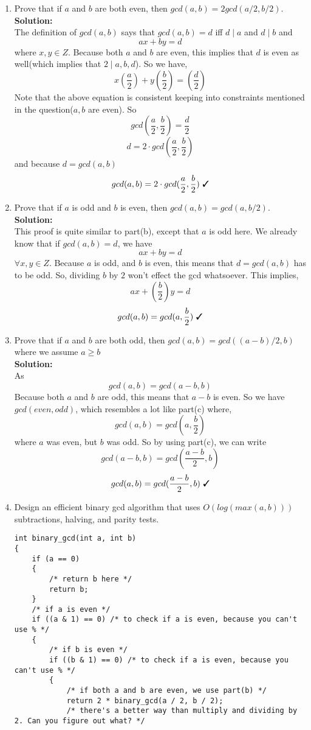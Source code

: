 \documentclass[11pt]{article}
\newcommand{\cmark}{\ding{51}}%
\begin{document}
\begin{enumerate}
\begin{enumerate}
				
				\item Prove that if $a$ and $b$ are both even, then $gcd(a,b) = 2gcd(a/2,b/2)$. \\
				\textbf{Solution: } \\
				The definition of $gcd(a, b)$ says that $gcd(a, b) = d$ iff $d \mid a$ and $d \mid b$ and $$ax + by = d$$ where $x, y \in Z$. Because both $a$ and $b$ are even, this implies that $d$ is even as well(which implies that $2 \mid a, b, d$). So we have, 
				$$x (\frac{a}{2}) + y (\frac{b}{2}) = (\frac{d}{2})$$
				Note that the above equation is consistent keeping into constraints mentioned in the question($a, b$ are even). So 
					$$gcd(\frac{a}{2}, \frac{b}{2}) = \frac{d}{2}$$
					$$d = 2 \cdot gcd(\frac{a}{2}, \frac{b}{2})$$
				and because $d = gcd(a, b)$
					$$gcd(a, b) = 2 \cdot gcd(\frac{a}{2}, \frac{b}{2}) \text{   \cmark}$$ 
				
				\item Prove that if $a$ is odd and $b$ is even, then $gcd(a,b) = gcd(a,b/2)$. \\
				\textbf{Solution: } \\
				This proof is quite similar to part(b), except that $a$ is odd here. We already know that if $gcd(a, b) = d$, we have 
								$$ax + by = d$$
				$\forall x, y \in Z$. Because $a$ is odd, and $b$ is even, this means that $d = gcd(a, b)$ has to be odd. So, dividing $b$ by $2$ won't effect the gcd whatsoever. This implies, 
								$$ax + (\frac{b}{2})y = d$$
					$$gcd(a, b) = gcd(a, \frac{b}{2}) \text{   \cmark}$$
				
				
				\item Prove that if $a$ and $b$ are both odd, then $gcd(a,b) = gcd((a−b)/2,b)$ where we assume $a \ge b$ \\
				\textbf{Solution: } \\
				As $$gcd(a, b) = gcd(a - b, b)$$
				Because both $a$ and $b$ are odd, this means that $a - b$ is even. So we have $gcd(even, odd)$, which resembles a lot like part(c) where, 
						$$gcd(a, b) = gcd(a, \frac{b}{2})$$
				where $a$ was even, but $b$ was odd. So by using part(c), we can write
				$$gcd(a - b, b) = gcd(\frac{a - b}{2}, b)$$
				$$gcd(a, b) = gcd(\frac{a - b}{2}, b) \text{   \cmark}$$
				
				
				\item Design an efficient binary gcd algorithm that uses $O(log(max(a,b)))$ subtractions, halving, and parity
				tests.
\begin{lstlisting}
int binary_gcd(int a, int b)
{
	if (a == 0)
	{
		/* return b here */
		return b;
	}	
	/* if a is even */
	if ((a & 1) == 0) /* to check if a is even, because you can't use % */
	{
		/* if b is even */
		if ((b & 1) == 0) /* to check if a is even, because you can't use % */
		{
			/* if both a and b are even, we use part(b) */
			return 2 * binary_gcd(a / 2, b / 2); 
			/* there's a better way than multiply and dividing by 2. Can you figure out what? */
		

\end{lstlisting}
\end{enumerate}
\end{enumerate}
\end{document}
